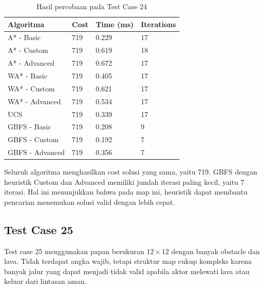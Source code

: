 \begin{table}[H]
	\centering
	\caption{Hasil percobaan pada Test Case 24}
	\small
	\begin{tabular}{|p{4cm}|p{2.5cm}|p{2.5cm}|p{2.5cm}|}
		\hline
		\rowcolor{gray!20}
		\textbf{Algoritma} & \textbf{Cost} & \textbf{Time (ms)} & \textbf{Iterations} \\
		\hline
		A* - Basic & 719 & 0.229 & 17 \\
		\hline
		A* - Custom & 719 & 0.619 & 18 \\
		\hline
		A* - Advanced & 719 & 0.672 & 17 \\
		\hline
		WA* - Basic & 719 & 0.405 & 17 \\
		\hline
		WA* - Custom & 719 & 0.621 & 17 \\
		\hline
		WA* - Advanced & 719 & 0.534 & 17 \\
		\hline
		UCS & 719 & 0.339 & 17 \\
		\hline
		GBFS - Basic & 719 & 0.208 & 9 \\
		\hline
		GBFS - Custom & 719 & 0.192 & 7 \\
		\hline
		GBFS - Advanced & 719 & 0.356 & 7 \\
		\hline
	\end{tabular}
\end{table}

\begin{tcolorbox}[
	colback=green!5,
	colframe=green!50!black,
	title=\textbf{Ringkasan Test Case 24},
	arc=2mm,
	boxrule=0.8pt
]
Seluruh algoritma menghasilkan cost solusi yang sama, yaitu 719. 
GBFS dengan heuristik Custom dan Advanced memiliki jumlah iterasi paling kecil, yaitu 7 iterasi. 
Hal ini menunjukkan bahwa pada map ini, heuristik dapat membantu pencarian menemukan solusi valid dengan lebih cepat.
\end{tcolorbox}


\subsection{Test Case 25}

\begin{tcolorbox}[
	colback=blue!5,
	colframe=blue!60!black,
	title=\textbf{Ringkasan Input Test Case 25},
	arc=2mm,
	boxrule=0.8pt
]
Test case 25 menggunakan papan berukuran $12 \times 12$ dengan banyak obstacle dan lava. 
Tidak terdapat angka wajib, tetapi struktur map cukup kompleks karena banyak jalur yang dapat menjadi tidak valid apabila aktor melewati lava atau keluar dari lintasan aman.
\end{tcolorbox}

